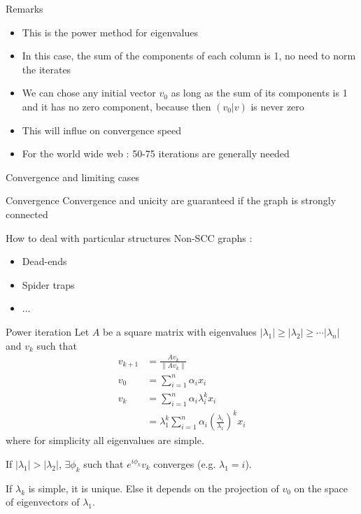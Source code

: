 \documentclass[10pt]{beamer}
\begin{document}
\begin{frame}{Remarks}
\begin{itemize}
\item This is the power method for eigenvalues
\item In this case, the sum of the components of each column is 1, no need to norm the iterates
\item We can chose any initial vector $v_0$ as long as the sum of its components is 1 and it has no zero component, because then $(v_0|v)$ is never zero
\item This will influe on convergence speed
\item For the world wide web : 50-75 iterations are generally needed
\end{itemize}
\end{frame}

\begin{frame}{Convergence and limiting cases}
\begin{block}{Convergence}
Convergence and unicity are guaranteed if the graph is strongly connected
\end{block}
\begin{block}{How to deal with particular structures}
Non-SCC graphs : 
\begin{itemize}
\item Dead-ends
\item Spider traps
\item ...
\end{itemize}
\end{block}
\end{frame}


\begin{frame}{Power iteration}
  Let $A$ be a square matrix with eigenvalues $|\lambda_1| \geq |\lambda_2| \geq \cdots |\lambda_n|$ and
  $v_k$ such that
  \begin{align*}
    v_{k+1} & = \frac{Av_k}{\|Av_k\|}\\
    v_0 & = \sum_{i=1}^n \alpha_i x_i\\
    v_k & = \sum_{i=1}^n \alpha_i \lambda_i^k x_i\\
        & = \lambda_1^k \sum_{i=1}^n \alpha_i \left(\frac{\lambda_i}{\lambda_1}\right)^k x_i
  \end{align*}
  where for simplicity all eigenvalues are simple.


  If $|\lambda_1| > |\lambda_2|$, $\exists \phi_k$ such that $e^{i\phi_k}v_k$ converges (e.g. $\lambda_1 = i$).

  If $\lambda_k$ is simple, it is unique.
  Else it depends on the projection of $v_0$ on the space of eigenvectors of $\lambda_1$.
\end{frame}
\end{document}

